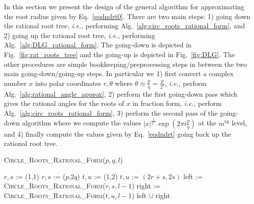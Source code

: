 \documentclass[runningheads]{llncs}
\begin{document}
In this section we present the design of the general algorithm for approximating the root radius given by Eq.~\ref{eqdndrt0}.
There are two main steps: 1) going down the rational root tree, \emph{i.e.,} performing Alg.~\ref{alg:circ_roots_rational_form}, and 2) going up the rational root tree, \emph{i.e.,} performing Alg.~\ref{alg:DLG_rational_form}.
The going-down is depicted in Fig.~\ref{fig:rat_roots_tree} and the going-up is depicted in Fig.~\ref{fig:DLG}.
The other procedures are simple bookkeeping/preprocessing steps in between the two main going-down/going-up steps.
In particular we
1) first convert a complex number $x$ into polar coordinates $r,\theta$ where $\theta \approx \frac{p}{q} = \frac{p}{2^\epsilon}$, \emph{i.e.,} perform Alg.~\ref{alg:rational_angle_approx},
2) perform the first going-down pass which gives the rational angles for the roots of $x$ in fraction form, \emph{i.e.,} perform Alg.~\ref{alg:circ_roots_rational_form},
3) perform the second pass of the going-down algorithm where we compute the values $|x|^{\frac{1}{2^m}} \exp(2 \pi i \frac{p}{q})$ at the $m^\mathrm{th}$ level, and
4) finally compute the values given by Eq.~\ref{eqdndrt} going back up the rational root tree.

\begin{algorithm}
   \caption{\textsc{Circle\_Roots\_Rational\_Form}($p,q,l$)}
   \label{alg:circ_roots_rational_form}
\begin{algorithmic}
  \STATE  $r, s$ := (1,1)
\ELSE
  \STATE  $r, s$ := ($p$,$2q$)
\ENDIF
    \STATE $t, u$ := (1,2)
  \ELSE
    \STATE $t, u$ := $(2r+s, 2s)$
  \ENDIF
		  \RETURN [($r,s$),($t,u$)]
		\STATE left  := \textsc{Circle\_Roots\_Rational\_Form}($r,s,l-1$)
		\STATE right := \textsc{Circle\_Roots\_Rational\_Form}($t,u,l-1$)
		\RETURN left $\cup$ right
	\ELSE
		\RETURN  [($p,q$)]
      \ENDIF
\end{algorithmic}
\end{algorithm}
\end{document}
